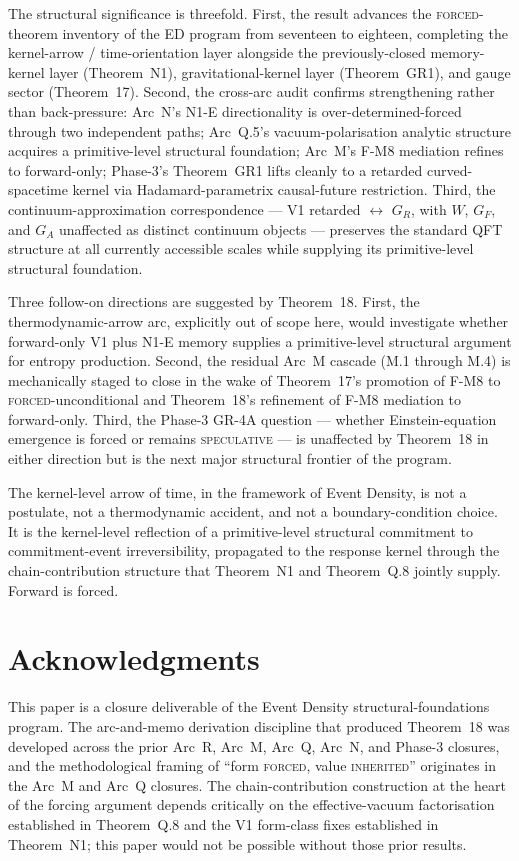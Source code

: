 \documentclass[11pt,a4paper]{article}
\begin{document}
The structural significance is threefold. First, the result advances the \textsc{forced}-theorem inventory of the ED program from seventeen to eighteen, completing the kernel-arrow / time-orientation layer alongside the previously-closed memory-kernel layer (Theorem~N1), gravitational-kernel layer (Theorem~GR1), and gauge sector (Theorem~17). Second, the cross-arc audit confirms strengthening rather than back-pressure: Arc~N's N1-E directionality is over-determined-forced through two independent paths; Arc~Q.5's vacuum-polarisation analytic structure acquires a primitive-level structural foundation; Arc~M's F-M8 mediation refines to forward-only; Phase-3's Theorem~GR1 lifts cleanly to a retarded curved-spacetime kernel via Hadamard-parametrix causal-future restriction. Third, the continuum-approximation correspondence --- V1 retarded $\leftrightarrow$ $G_R$, with $W$, $G_F$, and $G_A$ unaffected as distinct continuum objects --- preserves the standard QFT structure at all currently accessible scales while supplying its primitive-level structural foundation.

Three follow-on directions are suggested by Theorem~18. First, the thermodynamic-arrow arc, explicitly out of scope here, would investigate whether forward-only V1 plus N1-E memory supplies a primitive-level structural argument for entropy production. Second, the residual Arc~M cascade (M.1 through M.4) is mechanically staged to close in the wake of Theorem~17's promotion of F-M8 to \textsc{forced}-unconditional and Theorem~18's refinement of F-M8 mediation to forward-only. Third, the Phase-3 GR-4A question --- whether Einstein-equation emergence is forced or remains \textsc{speculative} --- is unaffected by Theorem~18 in either direction but is the next major structural frontier of the program.

The kernel-level arrow of time, in the framework of Event Density, is not a postulate, not a thermodynamic accident, and not a boundary-condition choice. It is the kernel-level reflection of a primitive-level structural commitment to commitment-event irreversibility, propagated to the response kernel through the chain-contribution structure that Theorem~N1 and Theorem~Q.8 jointly supply. Forward is forced.

\section*{Acknowledgments}

This paper is a closure deliverable of the Event Density structural-foundations program. The arc-and-memo derivation discipline that produced Theorem~18 was developed across the prior Arc~R, Arc~M, Arc~Q, Arc~N, and Phase-3 closures, and the methodological framing of ``form \textsc{forced}, value \textsc{inherited}'' originates in the Arc~M and Arc~Q closures. The chain-contribution construction at the heart of the forcing argument depends critically on the effective-vacuum factorisation established in Theorem~Q.8 and the V1 form-class fixes established in Theorem~N1; this paper would not be possible without those prior results.
\end{document}

